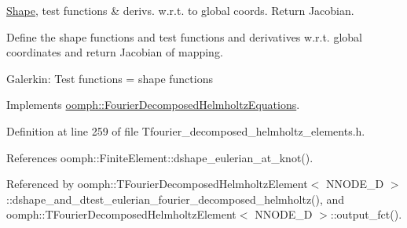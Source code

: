 \hyperlink{classoomph_1_1Shape}{Shape}, test functions \& derivs. w.\+r.\+t. to global coords. Return Jacobian. 

Define the shape functions and test functions and derivatives w.\+r.\+t. global coordinates and return Jacobian of mapping.

Galerkin\+: Test functions = shape functions 

Implements \hyperlink{classoomph_1_1FourierDecomposedHelmholtzEquations_aa19bdb12fe50805a9ad1f75912c85678}{oomph\+::\+Fourier\+Decomposed\+Helmholtz\+Equations}.



Definition at line 259 of file Tfourier\+\_\+decomposed\+\_\+helmholtz\+\_\+elements.\+h.



References oomph\+::\+Finite\+Element\+::dshape\+\_\+eulerian\+\_\+at\+\_\+knot().



Referenced by oomph\+::\+T\+Fourier\+Decomposed\+Helmholtz\+Element$<$ N\+N\+O\+D\+E\+\_\+D $>$\+::dshape\+\_\+and\+\_\+dtest\+\_\+eulerian\+\_\+fourier\+\_\+decomposed\+\_\+helmholtz(), and oomph\+::\+T\+Fourier\+Decomposed\+Helmholtz\+Element$<$ N\+N\+O\+D\+E\+\_\+D $>$\+::output\+\_\+fct().

\mbox{\label{classoomph_1_1TFourierDecomposedHelmholtzElement_ae54e119a74f455c251ede7d536a7c0ab}} 
